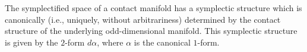 The symplectified space of a contact manifold has a symplectic structure which is canonically (i.e., uniquely, without arbitrariness) determined by the contact structure of the underlying odd-dimensional manifold. This symplectic structure is given by the $2$-form $d\alpha$, where $\alpha$ is the canonical $1$-form.
